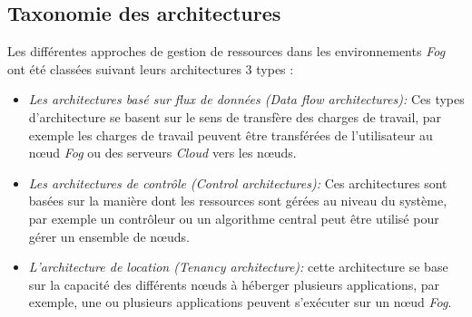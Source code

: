  \subsection{Taxonomie des architectures}
 Les différentes approches de gestion de ressources dans les environnements \emph{Fog} ont été classées suivant leurs architectures 3 types\cite{ch2019} :
 \begin{itemize}
   \item \emph{Les architectures basé sur flux de données (Data flow architectures):} Ces types d'architecture se basent sur le sens de transfère des charges de travail, par exemple les charges de travail peuvent être transférées de l'utilisateur au nœud \emph{Fog} ou des serveurs \emph{Cloud} vers les nœuds.
   \item \emph{Les architectures de contrôle (Control architectures):} Ces architectures sont basées sur la manière dont les ressources sont gérées au niveau du système, par exemple un contrôleur ou un algorithme central peut être utilisé pour gérer un ensemble de nœuds.
   \item \emph{L'architecture de location (Tenancy architecture):} cette architecture se base sur la capacité des différents nœuds à héberger plusieurs applications,  par exemple, une ou plusieurs applications peuvent s'exécuter sur un nœud \emph{Fog}.
 \end{itemize}
 
 
 
   
  



 

